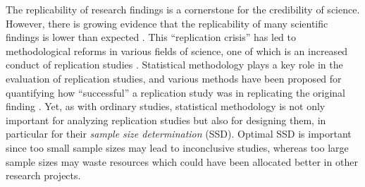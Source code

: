 The replicability of research findings is a cornerstone for the credibility of
science. However, there is growing evidence that the replicability of many
scientific findings is lower than expected \citep{Ioannidis2005,Opensc2015,
  Camerer2018, Errington2021}. This ``replication crisis'' has led to
methodological reforms in various fields of science, one of which is an
increased conduct of replication studies \citep{Munafo2017}. Statistical
methodology plays a key role in the evaluation of replication studies, and
various methods have been proposed for quantifying how ``successful'' a
replication study was in replicating the original finding \citep[among
others]{Bayarri2002, Verhagen2014, Simonsohn2015, Anderson2016, Patil2016,
  Johnson2016, Etz2016, vanAert2017, Ly2018, Harms2019, Hedges2019, Mathur2020,
  Held2020, Pawel2020, Bonett2020, Held2021, Pawel2022b}. Yet, as with ordinary
studies, statistical methodology is not only important for analyzing replication
studies but also for designing them, in particular for their \emph{sample size
  determination} (SSD). Optimal SSD is important since too small sample sizes
may lead to inconclusive studies, whereas too large sample sizes may waste
resources which could have been allocated better in other research projects.

